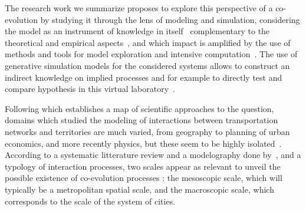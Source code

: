 \documentclass[11pt]{article}
\begin{document}
The research work we summarize proposes to explore this perspective of a co-evolution by studying it through the lens of modeling and simulation, considering the model as an instrument of knowledge in itself~\citep{banos2013pour} complementary to the theoretical and empirical aspects~\citep{raimbault2017applied}, and which impact is amplified by the use of methods and tools for model exploration and intensive computation~\citep{pumain2017urban}. The use of generative simulation models for the considered systems allows to construct an indirect knowledge on implied processes and for example to directly test and compare hypothesis in this virtual laboratory~\citep{epstein1996growing}.


Following \cite{raimbault2017invisible} which establishes a map of scientific approaches to the question, domains which studied the modeling of interactions between transportation networks and territories are much varied, from geography to planning of urban economics, and more recently physics, but these seem to be highly isolated~\citep{raimbault2017models}. According to a systematic litterature review and a modelography done by~\cite{raimbault2018caracterisation}, and a typology of interaction processes, two scales appear as relevant to unveil the possible existence of co-evolution processes : the mesoscopic scale, which will typically be a metropolitan spatial scale, and the macroscopic scale, which corresponds to the scale of the system of cities.
\end{document}
